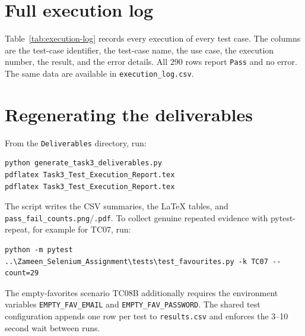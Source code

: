 \documentclass[11pt,a4paper]{article}
\begin{document}
\appendix
\section{Full execution log}
\label{app:log}

Table~\ref{tab:execution-log} records every execution of every test case.
The columns are the test-case identifier, the test-case name, the use case,
the execution number, the result, and the error details. All 290 rows report
\texttt{Pass} and no error. The same data are available in
\texttt{execution\_log.csv}.



\section{Regenerating the deliverables}
\label{app:regen}

From the \texttt{Deliverables} directory, run:

\begin{verbatim}
python generate_task3_deliverables.py
pdflatex Task3_Test_Execution_Report.tex
pdflatex Task3_Test_Execution_Report.tex
\end{verbatim}

The script writes the CSV summaries, the LaTeX tables, and
\texttt{pass\_fail\_counts.png}/\texttt{.pdf}. To collect genuine repeated
evidence with pytest-repeat, for example for TC07, run:

\begin{verbatim}
python -m pytest ..\Zameen_Selenium_Assignment\tests\test_favourites.py -k TC07 --count=29
\end{verbatim}

The empty-favorites scenario TC08B additionally requires the environment
variables \texttt{EMPTY\_FAV\_EMAIL} and \texttt{EMPTY\_FAV\_PASSWORD}. The
shared test configuration appends one row per test to \texttt{results.csv}
and enforces the 3--10 second wait between runs.
\end{document}
